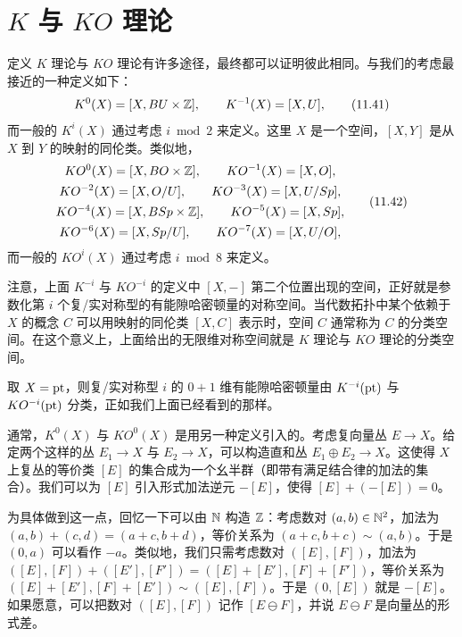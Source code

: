 
\section{$K$ 与 $KO$ 理论}

定义 $K$ 理论与 $KO$ 理论有许多途径，最终都可以证明彼此相同。与我们的考虑最接近的一种定义如下：
\begin{equation}
K^0(X)=[X,BU\times\mathbb{Z}],\qquad K^{-1}(X)=[X,U], \tag{11.41}
\end{equation}
而一般的 $K^i(X)$ 通过考虑 $i\bmod 2$ 来定义。这里 $X$ 是一个空间，$[X,Y]$ 是从 $X$ 到 $Y$ 的映射的同伦类。类似地，
\begin{equation}
\begin{gathered}
KO^0(X)=[X,BO\times\mathbb{Z}],\qquad KO^{-1}(X)=[X,O],\\
KO^{-2}(X)=[X,O/U],\qquad KO^{-3}(X)=[X,U/Sp],\\
KO^{-4}(X)=[X,BSp\times\mathbb{Z}],\qquad KO^{-5}(X)=[X,Sp],\\
KO^{-6}(X)=[X,Sp/U],\qquad KO^{-7}(X)=[X,U/O],
\end{gathered} \tag{11.42}
\end{equation}
而一般的 $KO^i(X)$ 通过考虑 $i\bmod 8$ 来定义。

注意，上面 $K^{-i}$ 与 $KO^{-i}$ 的定义中 $[X,-]$ 第二个位置出现的空间，正好就是参数化第 $i$ 个复/实对称型的有能隙哈密顿量的对称空间。当代数拓扑中某个依赖于 $X$ 的概念 $C$ 可以用映射的同伦类 $[X,C]$ 表示时，空间 $C$ 通常称为 $C$ 的分类空间。在这个意义上，上面给出的无限维对称空间就是 $K$ 理论与 $KO$ 理论的分类空间。

取 $X=\mathrm{pt}$，则复/实对称型 $i$ 的 $0+1$ 维有能隙哈密顿量由 $K^{-i}(\mathrm{pt})$ 与 $KO^{-i}(\mathrm{pt})$ 分类，正如我们上面已经看到的那样。

通常，$K^0(X)$ 与 $KO^0(X)$ 是用另一种定义引入的。考虑复向量丛 $E\to X$。给定两个这样的丛 $E_1\to X$ 与 $E_2\to X$，可以构造直和丛 $E_1\oplus E_2\to X$。这使得 $X$ 上复丛的等价类 $[E]$ 的集合成为一个幺半群（即带有满足结合律的加法的集合）。我们可以为 $[E]$ 引入形式加法逆元 $-[E]$，使得 $[E]+(-[E])=0$。

为具体做到这一点，回忆一下可以由 $\mathbb{N}$ 构造 $\mathbb{Z}$：考虑数对 $(a,b)\in\mathbb{N}^2$，加法为 $(a,b)+(c,d)=(a+c,b+d)$，等价关系为 $(a+c,b+c)\sim(a,b)$。于是 $(0,a)$ 可以看作 $-a$。类似地，我们只需考虑数对 $([E],[F])$，加法为 $([E],[F])+([E'],[F'])=([E]+[E'],[F]+[F'])$，等价关系为 $([E]+[E'],[F]+[E'])\sim([E],[F])$。于是 $(0,[E])$ 就是 $-[E]$。如果愿意，可以把数对 $([E],[F])$ 记作 $[E\ominus F]$，并说 $E\ominus F$ 是向量丛的形式差。

